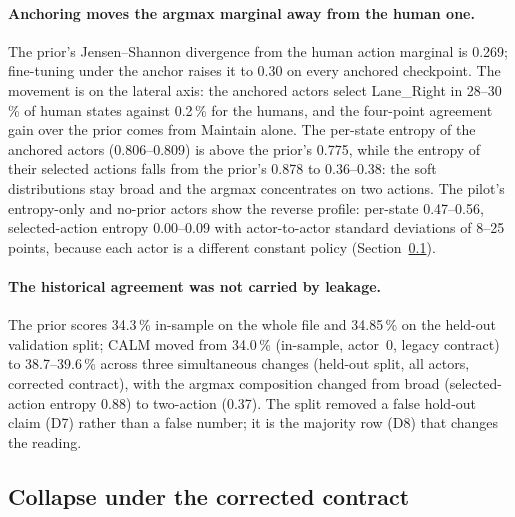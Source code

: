 \paragraph{Anchoring moves the argmax marginal away from the human one.}
The prior's Jensen--Shannon divergence from the human action marginal is 0.269; fine-tuning under the anchor raises it to 0.30 on every anchored checkpoint. The movement is on the lateral axis: the anchored actors select Lane\_Right in 28--30\,\% of human states against 0.2\,\% for the humans, and the four-point agreement gain over the prior comes from Maintain alone. The per-state entropy of the anchored actors (0.806--0.809) is above the prior's 0.775, while the entropy of their selected actions falls from the prior's 0.878 to 0.36--0.38: the soft distributions stay broad and the argmax concentrates on two actions. The pilot's entropy-only and no-prior actors show the reverse profile: per-state 0.47--0.56, selected-action entropy 0.00--0.09 with actor-to-actor standard deviations of 8--25 points, because each actor is a different constant policy (Section~\ref{sec:collapse}).

\paragraph{The historical agreement was not carried by leakage.}
The prior scores 34.3\,\% in-sample on the whole file and 34.85\,\% on the held-out validation split; CALM moved from 34.0\,\% (in-sample, actor~0, legacy contract) to 38.7--39.6\,\% across three simultaneous changes (held-out split, all actors, corrected contract), with the argmax composition changed from broad (selected-action entropy 0.88) to two-action (0.37). The split removed a false hold-out claim (D7) rather than a false number; it is the majority row (D8) that changes the reading.



\subsection{Collapse under the corrected contract}
\label{sec:collapse}

